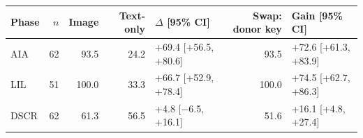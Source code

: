 \begin{tabular}{lrrrlrl}
\toprule
Phase & $n$ & Image & Text-only & $\Delta$ [95\% CI] & Swap: donor key & Gain [95\% CI] \\
\midrule
AIA & 62 & 93.5 & 24.2 & +69.4 [+56.5, +80.6] & 93.5 & +72.6 [+61.3, +83.9] \\
LIL & 51 & 100.0 & 33.3 & +66.7 [+52.9, +78.4] & 100.0 & +74.5 [+62.7, +86.3] \\
DSCR & 62 & 61.3 & 56.5 & +4.8 [$-$6.5, +16.1] & 51.6 & +16.1 [+4.8, +27.4] \\
\bottomrule
\end{tabular}
